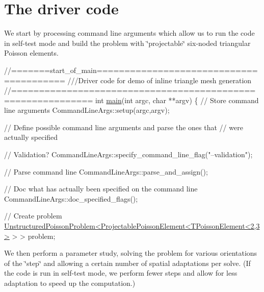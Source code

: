  

\hypertarget{index_main}{}\section{The driver code}\label{index_main}
We start by processing command line arguments which allow us to run the code in self-\/test mode and build the problem with \char`\"{}projectable\char`\"{} six-\/noded triangular Poisson elements.

 
\begin{DoxyCodeInclude}
\textcolor{comment}{//=======start\_of\_main========================================}
\textcolor{comment}{///Driver code for demo of inline triangle mesh generation}
\textcolor{comment}{}\textcolor{comment}{//============================================================}
\textcolor{keywordtype}{int} \hyperlink{mesh__from__inline__triangle_8cc_a3c04138a5bfe5d72780bb7e82a18e627}{main}(\textcolor{keywordtype}{int} argc, \textcolor{keywordtype}{char} **argv)
\{
 \textcolor{comment}{// Store command line arguments}
 CommandLineArgs::setup(argc,argv);
 
 \textcolor{comment}{// Define possible command line arguments and parse the ones that}
 \textcolor{comment}{// were actually specified}
 
 \textcolor{comment}{// Validation?}
 CommandLineArgs::specify\_command\_line\_flag(\textcolor{stringliteral}{"--validation"});

 \textcolor{comment}{// Parse command line}
 CommandLineArgs::parse\_and\_assign(); 
 
 \textcolor{comment}{// Doc what has actually been specified on the command line}
 CommandLineArgs::doc\_specified\_flags();
 
 \textcolor{comment}{// Create problem}
 \hyperlink{classUnstructuredPoissonProblem}{UnstructuredPoissonProblem<ProjectablePoissonElement<TPoissonElement<2,3>}
       > >
  problem;

\end{DoxyCodeInclude}


We then perform a parameter study, solving the problem for various orientations of the \char`\"{}step\char`\"{} and allowing a certain number of spatial adaptations per solve. (If the code is run in self-\/test mode, we perform fewer steps and allow for less adaptation to speed up the computation.)


